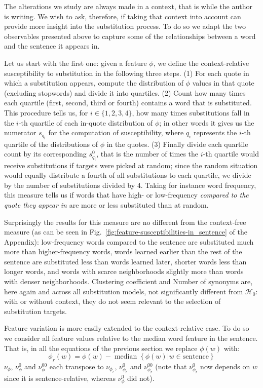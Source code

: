 \begin{new}

The alterations we study are always made in a context, that is while the author is writing.
We wish to ask, therefore, if taking that context into account can provide more insight into the substitution process.
To do so we adapt the two observables presented above to capture some of the relationships between a word and the sentence it appears in.

Let us start with the first one:
given a feature $\phi$, we define the context-relative susceptibility to substitution in the following three steps.
(1) For each quote in which a substitution appears, compute the distribution of $\phi$ values in that quote (excluding stopwords) and divide it into quartiles.
(2) Count how many times each quartile (first, second, third or fourth) contains a word that is substituted.
This procedure tells us, for $i \in \{1, 2, 3, 4\}$, how many times substitutions fall in the $i$-th quartile of each in-quote distribution of $\phi$;
in other words it gives us the numerator $s_{q_i}$ for the computation of susceptibility, where $q_i$ represents the $i$-th quartile of the distributions of $\phi$ in the quotes.
(3) Finally divide each quartile count by its corresponding $s_{q_i}^0$, that is the number of times the $i$-th quartile would receive substitutions if targets were picked at random;
since the random situation would equally distribute a fourth of all substitutions to each quartile, we divide by the number of substitutions divided by 4.
Taking for instance word frequency, this measure tells us if words that have high- or low-frequency \emph{compared to the quote they appear in} are more or less substituted than at random.

Surprisingly the results for this measure are no different from the context-free measure (as can be seen in Fig.~\ref{fig:feature-susceptibilities-in_sentence} of the Appendix):
low-frequency words compared to the sentence are substituted much more than higher-frequency words, words learned earlier than the rest of the sentence are substituted less than words learned later, shorter words less than longer words, and words with scarce neighborhoods slightly more than words with denser neighborhoods.
Clustering coefficient and Number of synonyms are, here again and across all substitution models, not significantly different from $\mathcal{H}_0$:
with or without context, they do not seem relevant to the selection of substitution targets.

Feature variation is more easily extended to the context-relative case.
To do so we consider all feature values relative to the median word feature in the sentence.
That is, in all the equations of the previous section we replace $\phi(w)$ with:
$$\phi_r(w) = \phi(w) - \operatorname{median}\left\lbrace \phi(w) | w \in \text{sentence} \right\rbrace$$
$\nu_{\phi}$, $\nu_{\phi}^0$ and $\nu_{\phi}^{00}$ each transpose to $\nu_{\phi_r}$, $\nu_{\phi_r}^0$ and $\nu_{\phi_r}^{00}$ (note that $\nu_{\phi_r}^0$ now depends on $w$ since it is sentence-relative, whereas $\nu_{\phi}^0$ did not).


\end{new}
